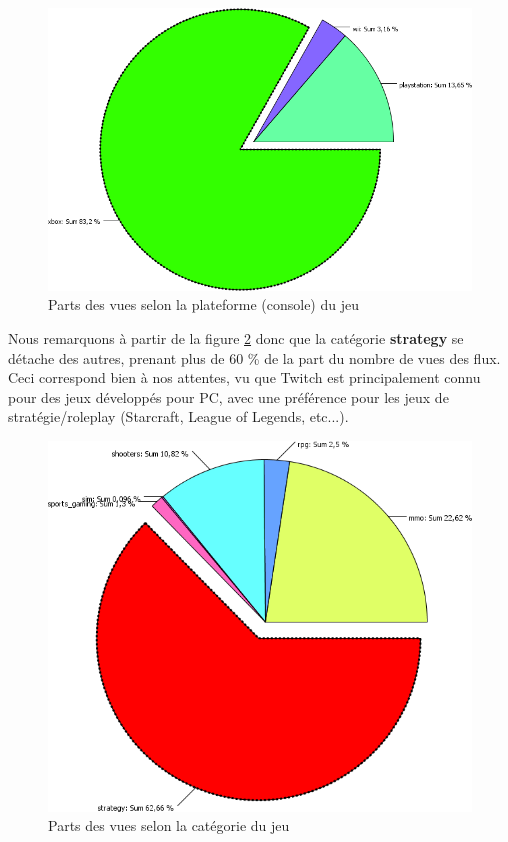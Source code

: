 \documentclass[11pt, a4paper, titlepage]{scrartcl}
\begin{document}
\begin{figure}[h]
    \centering
    \includegraphics[scale=0.4]{images/main_consoles}
    \caption{\label{fig:main_consoles} Parts des vues selon la plateforme
        (console) du jeu}
\end{figure}

Nous remarquons à partir de la figure \ref{fig:main_categories} donc que la
catégorie \textbf{strategy} se détache des autres, prenant plus de 60 \% de la
part du nombre de vues des flux. Ceci correspond bien à nos attentes, vu que
Twitch est principalement connu pour des jeux développés pour PC, avec une
préférence pour les jeux de stratégie/roleplay (Starcraft, League of Legends,
etc...).

\begin{figure}[h]
    \centering
    \includegraphics[scale=0.4]{images/main_categories}
    \caption{\label{fig:main_categories} Parts des vues selon la catégorie du
        jeu}
\end{figure}
\end{document}
